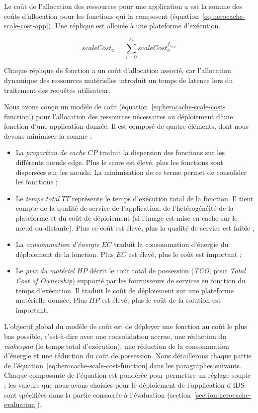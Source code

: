 {Le coût de l'allocation des ressources pour une application $a$ est la somme des coûts d'allocation pour les fonctions qui la composent (équation~\ref{eq:herocache-scale-cost-app}). Une réplique est allouée à une plateforme d'exécution.

\begin{equation}
    scaleCost_{a} = \, \sum_{i = 0}^{F_{a}} scaleCost^{{f}_{{i}_{N, P}}}_a
\label{eq:herocache-scale-cost-app}
\end{equation}

Chaque réplique de fonction a un coût d'allocation associé, car l'allocation dynamique des ressources matérielles introduit un temps de latence lors du traitement des requêtes utilisateur.

Nous avons conçu un modèle de coût (équation~\ref{eq:herocache-scale-cost-function}) pour l'allocation des ressources nécessaires au déploiement d'une fonction d'une application donnée. Il est composé de quatre éléments, dont nous devons minimiser la somme :

\begin{itemize}
    \item La \textit{proportion de cache} $CP$ traduit la dispersion des fonctions sur les différents nœuds edge. Plus le score est élevé, plus les fonctions sont dispersées sur les nœuds. La minimisation de ce terme permet de consolider les fonctions ;
    \item Le \textit{temps total} $TT$ représente le temps d'exécution total de la fonction. Il tient compte de la qualité de service de l'application, de l'hétérogénéité de la plateforme et du coût de déploiement (si l'image est mise en cache sur le nœud ou distante). Plus ce coût est élevé, plus la qualité de service est faible ;
    \item La \textit{consommation d'énergie} $EC$ traduit la consommation d'énergie du déploiement de la fonction. Plus $EC$ est élevé, plus le coût est important ;
    \item Le \textit{prix du matériel} $HP$ décrit le coût total de possession (\textit{TCO}, pour \textit{Total Cost of Ownership}) supporté par les fournisseurs de services en fonction du temps d'exécution. Il traduit le coût de déploiement sur une plateforme matérielle donnée. Plus $HP$ est élevé, plus le coût de la solution est important.
\end{itemize}

L'objectif global du modèle de coût est de déployer une fonction au coût le plus bas possible, c'est-à-dire avec une consolidation accrue, une réduction du \textit{makespan} (le temps total d'exécution), une réduction de la consommation d'énergie et une réduction du coût de possession. Nous détaillerons chaque partie de l'équation~\ref{eq:herocache-scale-cost-function} dans les paragraphes suivants. Chaque composante de l'équation est pondérée pour permettre un réglage souple ; les valeurs que nous avons choisies pour le déploiement de l'application d'IDS sont spécifiées dans la partie consacrée à l'évaluation (section~\ref{section:herocache-evaluation}).

}
